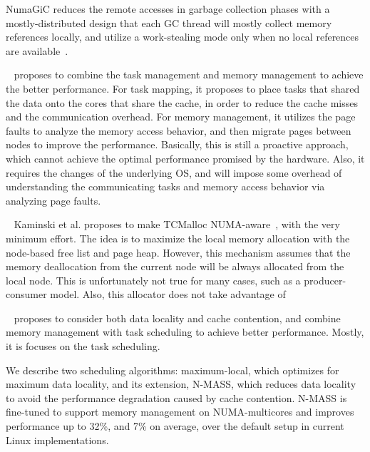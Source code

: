 NumaGiC reduces the remote accesses in garbage collection phases with a mostly-distributed design that each GC thread will mostly collect memory references locally, and utilize a work-stealing mode only when no local references are available~\cite{NumaGiC}.  


~\cite{diener2015automatic} proposes to combine the task management and memory management to achieve the better performance. For task mapping, it proposes to place tasks that shared the data onto the cores that share the cache, in order to reduce the cache misses and the communication overhead. For memory management, it utilizes the page faults to analyze the memory access behavior, and then migrate pages between nodes to improve the performance. Basically, this is still a proactive approach, which cannot achieve the optimal performance promised by the hardware. Also, it requires the changes of the underlying OS, and will impose some overhead of understanding the communicating tasks and memory access behavior via analyzing page faults.  

 
~\cite{1419934}
Kaminski et al. proposes to make TCMalloc NUMA-aware~\cite{tcmallocnew}, with the very minimum effort. The idea is to maximize the local memory allocation with the node-based free list and page heap. However, this mechanism assumes that the memory deallocation from the current node will be always allocated from the local node. This is unfortunately not true for many cases, such as a producer-consumer model. Also, this allocator does not take advantage of 

~\cite{Majo:2011:MMN:1993478.1993481} proposes to consider both data locality and cache contention, and combine memory management with task scheduling to achieve better performance. Mostly, it is focuses on the task scheduling. 
 
We describe two scheduling algorithms: maximum-local, which optimizes for maximum data locality, and its extension, N-MASS, which reduces data locality to avoid the performance degradation caused by cache contention. N-MASS is fine-tuned to support memory management on NUMA-multicores and improves performance up to 32\%, and 7\% on average, over the default setup in current Linux implementations.


